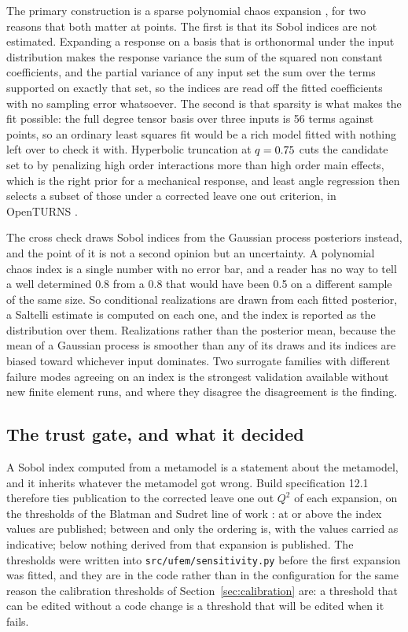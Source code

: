 \documentclass[11pt,a4paper]{article}
\begin{document}
The primary construction is a sparse polynomial chaos expansion
\cite{blatman2011,luethen2021}, for two reasons that both
matter at \NValid{} points. The first is that its Sobol indices are not estimated. Expanding a
response on a basis that is orthonormal under the input distribution makes the response
variance the sum of the squared non constant coefficients, and the partial variance of any
input set the sum over the terms supported on exactly that set, so the indices are read off the
fitted coefficients with no sampling error whatsoever. The second is that sparsity is what
makes the fit possible: the full degree \SensDegree{} tensor basis over three inputs is 56
terms against \NValid{} points, so an ordinary least squares fit would be a rich model fitted
with nothing left over to check it with. Hyperbolic truncation at $q = 0.75$ cuts
the candidate set to \SensCandidateTerms{} by penalizing high order interactions more than high
order main effects, which is the right prior for a mechanical response, and least angle
regression then selects a subset of those under a corrected leave one out criterion, in
OpenTURNS \cite{openturns}.

The cross check draws Sobol indices from the Gaussian process posteriors instead, and the point
of it is not a second opinion but an uncertainty. A polynomial chaos index is a single number
with no error bar, and a reader has no way to tell a well determined 0.8 from a 0.8 that would
have been 0.5 on a different sample of the same size. So \SensRealizations{} conditional
realizations are drawn from each fitted posterior, a Saltelli estimate is computed on each one,
and the index is reported as the distribution over them. Realizations rather than the posterior
mean, because the mean of a Gaussian process is smoother than any of its draws and its indices
are biased toward whichever input dominates. Two surrogate families with different failure
modes agreeing on an index is the strongest validation available without new finite element
runs, and where they disagree the disagreement is the finding.

\subsection{The trust gate, and what it decided}
\label{sec:q2gate}
A Sobol index computed from a metamodel is a statement about the metamodel, and it inherits
whatever the metamodel got wrong. Build specification 12.1 therefore ties publication to the
corrected leave one out $Q^2$ of each expansion, on the thresholds of the Blatman and Sudret
line of work \cite{blatman2011}: at or above \SensQTwoValues{} the index values are published; between
\SensQTwoRankings{} and \SensQTwoValues{} only the ordering is, with the values carried as
indicative; below \SensQTwoRankings{} nothing derived from that expansion is published. The
thresholds were written into \texttt{src/ufem/sensitivity.py} before the first expansion was
fitted, and they are in the code rather than in the configuration for the same reason the
calibration thresholds of Section~\ref{sec:calibration} are: a threshold that can be edited
without a code change is a threshold that will be edited when it fails.
\end{document}
